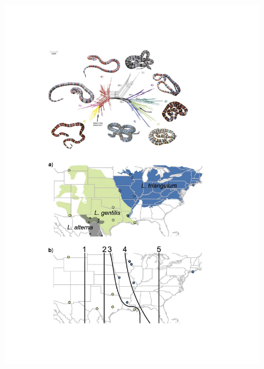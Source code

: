 \documentclass[A4]{article1}
\begin{document}
\begin{figure}
    \centering %
    \includegraphics[scale=0.24]{figs/fig-miksnakes} %

\end{figure}
\end{document}
